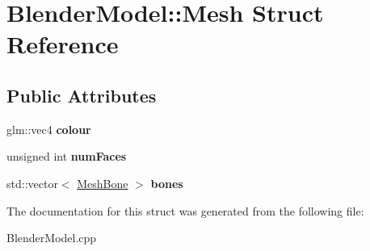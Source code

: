 \hypertarget{structBlenderModel_1_1Mesh}{\section{\-Blender\-Model\-:\-:\-Mesh \-Struct \-Reference}
\label{structBlenderModel_1_1Mesh}
}
\subsection*{\-Public \-Attributes}
\begin{DoxyCompactItemize}
\item 
\hypertarget{structBlenderModel_1_1Mesh_a6955b3986440a8af828e6d50075e322a}{glm\-::vec4 {\bfseries colour}}\label{structBlenderModel_1_1Mesh_a6955b3986440a8af828e6d50075e322a}

\item 
\hypertarget{structBlenderModel_1_1Mesh_a397355576ac33eacebc97b4d214fc209}{unsigned int {\bfseries num\-Faces}}\label{structBlenderModel_1_1Mesh_a397355576ac33eacebc97b4d214fc209}

\item 
\hypertarget{structBlenderModel_1_1Mesh_a9c1274eb64edadd2b4b23bee6eae5dda}{std\-::vector$<$ \hyperlink{structMeshBone}{\-Mesh\-Bone} $>$ {\bfseries bones}}\label{structBlenderModel_1_1Mesh_a9c1274eb64edadd2b4b23bee6eae5dda}

\end{DoxyCompactItemize}


\-The documentation for this struct was generated from the following file\-:\begin{DoxyCompactItemize}
\item 
\-Blender\-Model.\-cpp\end{DoxyCompactItemize}
